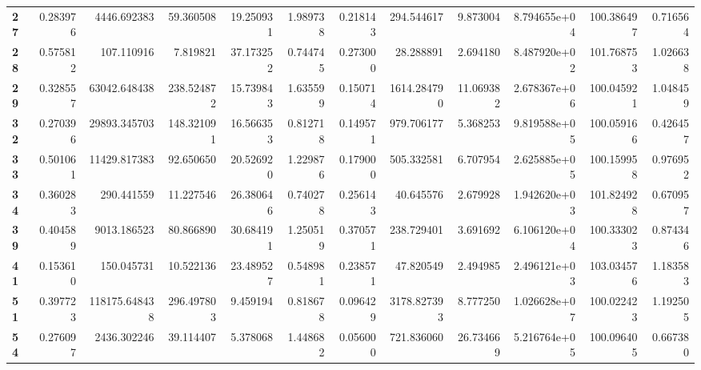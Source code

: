 \begin{table}[h]
\begin{tabular}{lrrrrrrrrrrr}
\textbf{27} &  0.283976 &    4446.692383 &       59.360508 &                  19.250931 &  1.989738 &  0.218143 &   294.544617 &   9.873004 &  8.794655e+04 &  100.386497 &     0.716564 \\
\textbf{28} &  0.575812 &     107.110916 &        7.819821 &                  37.173252 &  0.744745 &  0.273000 &    28.288891 &   2.694180 &  8.487920e+02 &  101.768753 &     1.026638 \\
\textbf{29} &  0.328557 &   63042.648438 &      238.524872 &                  15.739843 &  1.635599 &  0.150714 &  1614.284790 &  11.069382 &  2.678367e+06 &  100.045921 &     1.048459 \\
\textbf{32} &  0.270396 &   29893.345703 &      148.321091 &                  16.566353 &  0.812718 &  0.149571 &   979.706177 &   5.368253 &  9.819588e+05 &  100.059166 &     0.426457 \\
\textbf{33} &  0.501061 &   11429.817383 &       92.650650 &                  20.526920 &  1.229876 &  0.179000 &   505.332581 &   6.707954 &  2.625885e+05 &  100.159958 &     0.976952 \\
\textbf{34} &  0.360283 &     290.441559 &       11.227546 &                  26.380646 &  0.740278 &  0.256143 &    40.645576 &   2.679928 &  1.942620e+03 &  101.824928 &     0.670957 \\
\textbf{39} &  0.404589 &    9013.186523 &       80.866890 &                  30.684191 &  1.250519 &  0.370571 &   238.729401 &   3.691692 &  6.106120e+04 &  100.333023 &     0.874346 \\
\textbf{41} &  0.153610 &     150.045731 &       10.522136 &                  23.489527 &  0.548981 &  0.238571 &    47.820549 &   2.494985 &  2.496121e+03 &  103.034576 &     1.183583 \\
\textbf{51} &  0.397723 &  118175.648438 &      296.497803 &                   9.459194 &  0.818678 &  0.096429 &  3178.827393 &   8.777250 &  1.026628e+07 &  100.022423 &     1.192505 \\
\textbf{54} &  0.276097 &    2436.302246 &       39.114407 &                   5.378068 &  1.448682 &  0.056000 &   721.836060 &  26.734669 &  5.216764e+05 &  100.096405 &     0.667380 \\
\bottomrule
\end{tabular}
\end{table}
